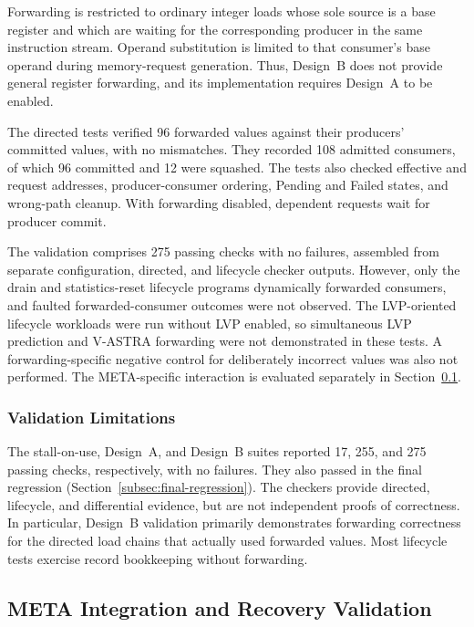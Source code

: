 Forwarding is restricted to ordinary integer loads whose sole source
is a base register and which are waiting for the corresponding
producer in the same instruction stream. Operand substitution is
limited to that consumer's base operand during memory-request
generation. Thus, Design~B does not provide general register
forwarding, and its implementation requires Design~A to be enabled.

The directed tests verified 96 forwarded values against their
producers' committed values, with no mismatches. They recorded 108
admitted consumers, of which 96 committed and 12 were squashed.
The tests also checked effective and request addresses, producer-consumer
ordering, Pending and Failed states, and wrong-path cleanup.
With forwarding disabled, dependent requests wait for producer commit.

The validation comprises 275 passing checks with no failures,
assembled from separate configuration, directed, and lifecycle
checker outputs. However, only the drain and statistics-reset lifecycle
programs dynamically forwarded consumers, and faulted forwarded-consumer outcomes were not observed.
The LVP-oriented lifecycle workloads were run without LVP enabled,
so simultaneous LVP prediction and V-ASTRA forwarding were not
demonstrated in these tests. A forwarding-specific negative control
for deliberately incorrect values was also not performed. The
META-specific interaction is evaluated separately in
Section~\ref{subsec:meta-integration-recovery-validation}.

\subsubsection{Validation Limitations}
\label{subsubsec:dependency-validation-provenance}

The stall-on-use, Design~A, and Design~B suites reported 17, 255,
and 275 passing checks, respectively, with no failures. They also passed in the final regression
(Section~\ref{subsec:final-regression}).
The checkers provide directed, lifecycle, and differential evidence,
but are not independent proofs of correctness. In particular,
Design~B validation primarily demonstrates forwarding correctness
for the directed load chains that actually used forwarded values.
Most lifecycle tests exercise record bookkeeping without forwarding.

\subsection{META Integration and Recovery Validation}
\label{subsec:meta-integration-recovery-validation}

